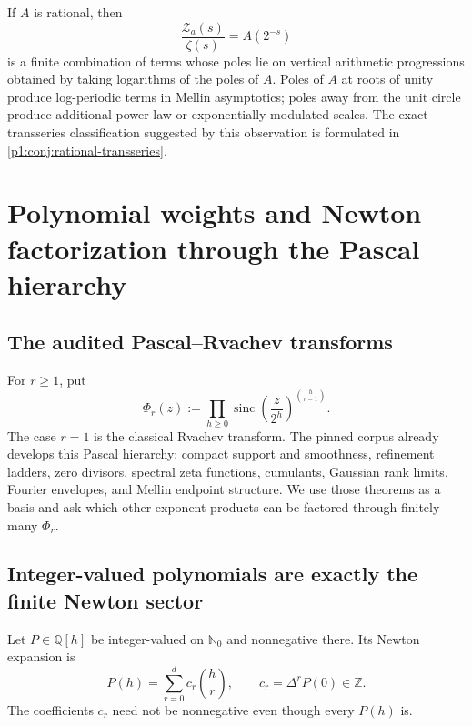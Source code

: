 \documentclass[11pt,oneside]{article}
\numberwithin{equation}{section}
\theoremstyle{definition}
\theoremstyle{remark}
\newcommand{\Q}{\mathbb Q}
\newcommand{\N}{\mathbb N}
\newcommand{\Z}{\mathbb Z}
\newcommand{\sinc}{\operatorname{sinc}}
\newcommand{\Zspec}{\mathcal Z}
\begin{document}
\begin{corollary}
\label{p1:cor:rational-poles}
If $A$ is rational, then
\begin{equation}
 \frac{\Zspec_a(s)}{\zeta(s)}=A(2^{-s})
 \label{p1:eq:rational-zeta-quotient}
\end{equation}
is a finite combination of terms whose poles lie on vertical arithmetic progressions
obtained by taking logarithms of the poles of $A$.  Poles of $A$ at roots of unity produce
log-periodic terms in Mellin asymptotics; poles away from the unit circle produce additional
power-law or exponentially modulated scales.  The exact transseries classification suggested
by this observation is formulated in \cref{p1:conj:rational-transseries}.
\end{corollary}


\section{Polynomial weights and Newton factorization through the Pascal hierarchy}
\label{p1:sec:newton}

\subsection{The audited Pascal--Rvachev transforms}

For $r\ge1$, put
\begin{equation}
 \Phi_r(z)
 :=\prod_{h\ge0}\sinc\!\left(\frac z{2^h}\right)^{\binom h{r-1}}.
 \label{p1:eq:pascal-transform}
\end{equation}
The case $r=1$ is the classical Rvachev transform.  The pinned corpus already develops this
Pascal hierarchy: compact support and smoothness, refinement ladders, zero divisors, spectral
zeta functions, cumulants, Gaussian rank limits, Fourier envelopes, and Mellin endpoint
structure.  We use those theorems as a basis and ask which other exponent products can be
factored through finitely many $\Phi_r$.

\subsection{Integer-valued polynomials are exactly the finite Newton sector}

Let $P\in\Q[h]$ be integer-valued on $\N_0$ and nonnegative there.  Its Newton expansion is
\begin{equation}
 P(h)=\sum_{r=0}^{d}c_r\binom hr,
 \qquad
 c_r=\Delta^rP(0)\in\Z.
 \label{p1:eq:newton-expansion}
\end{equation}
The coefficients $c_r$ need not be nonnegative even though every $P(h)$ is.
\end{document}
